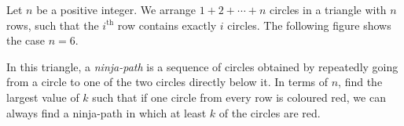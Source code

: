 Let $n$ be a positive integer. We arrange $1 + 2 + \cdots + n$ circles in a triangle with $n$ rows, such that the $i^{\text{th}}$ row contains exactly $i$ circles. The following figure shows the case $n = 6$.

In this triangle, a \emph{ninja-path} is a sequence of circles obtained by repeatedly going from a circle to one of the two circles directly below it. In terms of $n$, find the largest value of $k$ such that if one circle from every row is coloured red, we can always find a ninja-path in which at least $k$ of the circles are red.
